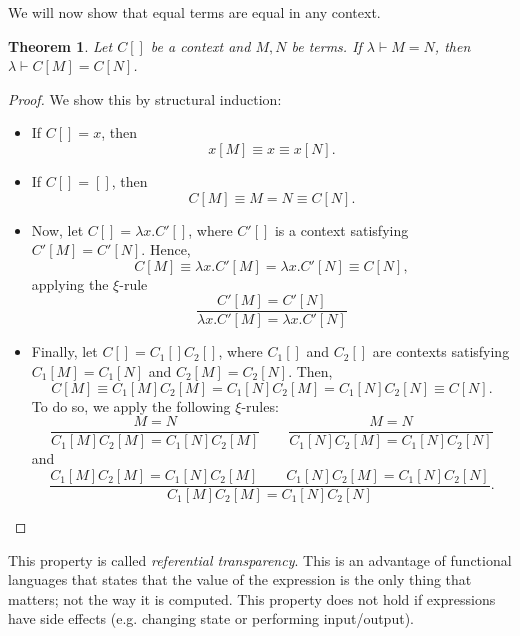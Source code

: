 \documentclass[a4paper, openany]{memoir}
\newtheorem{theorem}[proposition]{Theorem}
\theoremstyle{definition}
\begin{document}
    We will now show that equal terms are equal in any context.
    \begin{theorem}
        Let $C[]$ be a context and $M, N$ be terms. If $\lambda \vdash M = N$, then $\lambda \vdash C[M] = C[N]$.
    \end{theorem}
    \begin{proof}
        We show this by structural induction:
        \begin{itemize}
            \item If $C[] = x$, then
            \[x[M] \equiv x \equiv x[N].\]

            \item If $C[] = []$, then
            \[C[M] \equiv M = N \equiv C[N].\]

            \item Now, let $C[] = \lambda x.C'[]$, where $C'[]$ is a context satisfying $C'[M] = C'[N]$. Hence,
            \[C[M] \equiv \lambda x.C'[M] = \lambda x.C'[N] \equiv C[N],\]
            applying the $\xi$-rule
           \[\frac{C'[M] = C'[N]}{\lambda x.C'[M] = \lambda x.C'[N]}\] 

           \item Finally, let $C[] = C_1[] C_2[]$, where $C_1[]$ and $C_2[]$ are contexts satisfying $C_1[M] = C_1[N]$ and $C_2[M] = C_2[N]$. Then,
           \[C[M] \equiv C_1[M] C_2[M] = C_1[N] C_2[M] = C_1[N] C_2[N] \equiv C[N].\]
           To do so, we apply the following $\xi$-rules:
           \[\frac{M = N}{C_1[M] C_2[M] = C_1[N] C_2[M]} \qquad \frac{M = N}{C_1[N] C_2[M] = C_1[N] C_2[N]}\]
           and
           \[\frac{C_1[M] C_2[M] = C_1[N] C_2[M] \qquad C_1[N] C_2[M] = C_1[N] C_2[N]}{C_1[M] C_2[M] = C_1[N] C_2[N]}.\]
        \end{itemize}
    \end{proof}
    \noindent This property is called \emph{referential transparency}. This is an advantage of functional languages that states that the value of the expression is the only thing that matters; not the way it is computed. This property does not hold if expressions have side effects (e.g. changing state or performing input/output).
\end{document}
